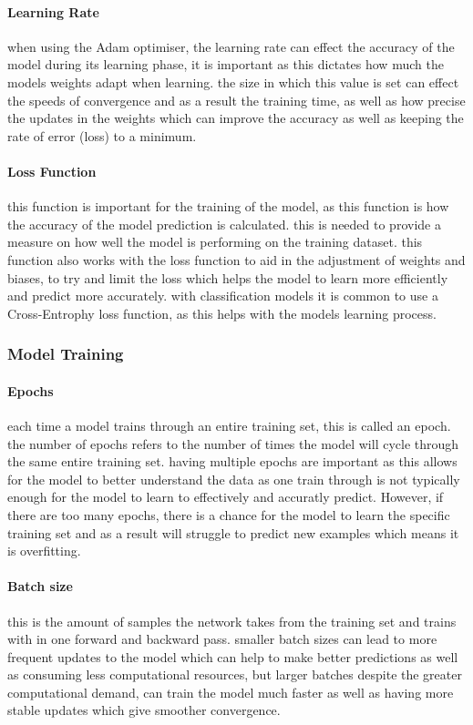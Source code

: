 \documentclass[]{final_report}
\begin{document}
\paragraph{Learning Rate}
when using the Adam optimiser, the learning rate can effect the accuracy of the model during its learning phase, it is important as this dictates how much the models weights adapt when learning. the size in which this value is set can effect the speeds of convergence and as a result the training time, as well as how precise the updates in the weights which can improve the accuracy as well as keeping the rate of error (loss) to a minimum.

\paragraph{Loss Function}
this function is important for the training of the model, as this function is how the accuracy of the model prediction is calculated. this is needed to provide a measure on how well the model is performing on the training dataset. this function also works with the loss function to aid in the adjustment of weights and biases, to try and limit the loss which helps the model to learn more efficiently and predict more accurately. with classification models it is common to use a Cross-Entrophy loss function, as this helps with the models learning process.

\subsubsection{Model Training}

\paragraph{Epochs}
each time a model trains through an entire training set, this is called an epoch. the number of epochs refers to the number of times the model will cycle through the same entire training set. having multiple epochs are important as this allows for the model to better understand the data as one train through is not typically enough for the model to learn to effectively and accuratly predict. However, if there are too many epochs, there is a chance for the model to learn the specific training set and as a result will struggle to predict new examples which means it is overfitting.

\paragraph{Batch size}
this is the amount of samples the network takes from the training set and trains with in one forward and backward pass. smaller batch sizes can lead to more frequent updates to the model which can help to make better predictions as well as consuming less computational resources, but larger batches despite the greater computational demand, can train the model much faster as well as having more stable updates which give smoother convergence.
\end{document}
